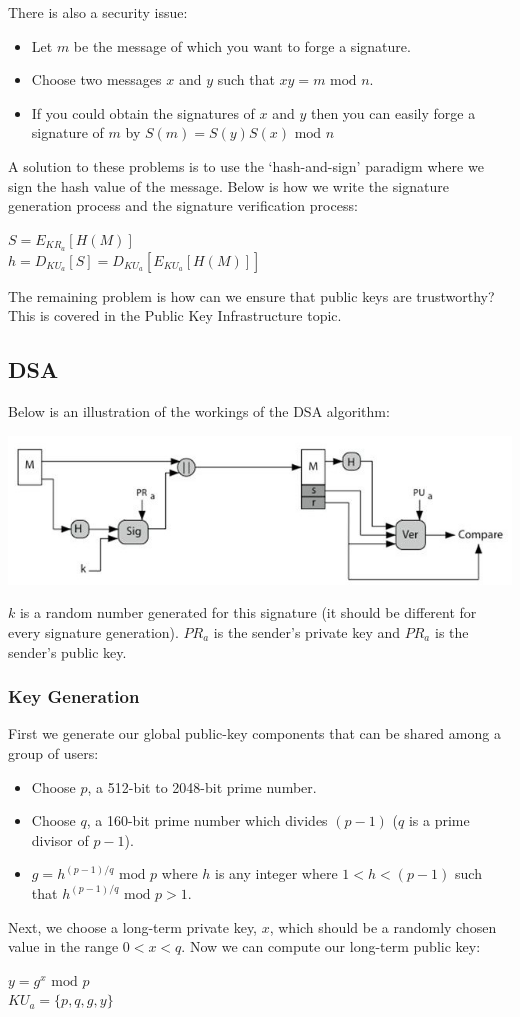 \documentclass{article}
\newcommand{\Mod}[1]{\text{ mod }#1}
\begin{document}
There is also a security issue:
\begin{itemize}
  \item Let $m$ be the message of which you want to forge a signature.
  \item Choose two messages $x$ and $y$ such that $xy = m \Mod n$.
  \item If you could obtain the signatures of $x$ and $y$ then you can easily forge a signature of $m$ by $S(m) = S(y)S(x) \Mod n$
\end{itemize}
A solution to these problems is to use the `hash-and-sign' paradigm where we sign the hash value of the message. Below is how we write the signature generation process and the signature verification process:
\begin{center}
  $S=E_{KR_{a}}[H(M)]$ \\
  $h=D_{KU_{a}}[S] = D_{KU_{a}}[E_{KU_{a}}[H(M)]]$
\end{center}
The remaining problem is how can we ensure that public keys are trustworthy? This is covered in the Public Key Infrastructure topic.

\subsection{DSA}
Below is an illustration of the workings of the DSA algorithm:
\begin{center}
  \includegraphics[scale=0.6]{dsa.jpg}
\end{center}
$k$ is a random number generated for this signature (it should be different for every signature generation). $PR_{a}$ is the sender's private key and $PR_{a}$ is the sender's public key.

\subsubsection{Key Generation}
First we generate our global public-key components that can be shared among a group of users:
\begin{itemize}
  \item Choose $p$, a 512-bit to 2048-bit prime number.
  \item Choose $q$, a 160-bit prime number which divides $(p-1)$ ($q$ is a prime divisor of $p-1$).
  \item $g = h^{(p-1)/q} \Mod p$ where $h$ is any integer where $1 < h < (p-1)$ such that $h^{(p-1)/q} \Mod p > 1$.
\end{itemize}
Next, we choose a long-term private key, $x$, which should be a randomly chosen value in the range $0 < x < q$. Now we can compute our long-term public key:
\begin{center}
  $y = g^{x} \Mod p$ \\
  $KU_{a} = \{p, q, g, y\}$
\end{center}
\end{document}
